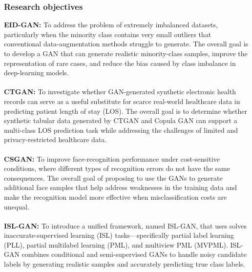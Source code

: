 \documentclass[12pt,a4paper]{article}
\begin{document}
\subsubsection{Research objectives}
\textbf{EID-GAN:} To address the problem of extremely imbalanced datasets, particularly when the minority class contains very small outliers that conventional data-augmentation methods struggle to generate. The overall goal is to develop a GAN that can generate realistic minority-class samples, improve the representation of rare cases, and reduce the bias caused by class imbalance in deep-learning models. \\
\\ \textbf{CTGAN:} To investigate whether GAN-generated synthetic electronic health records can serve as a useful substitute for scarce real-world healthcare data in predicting patient length of stay (LOS). The overall goal is to determine whether synthetic tabular data generated by CTGAN and Copula GAN can support a multi-class LOS prediction task while addressing the challenges of limited and privacy-restricted healthcare data. \\
\\ \textbf{CSGAN:} To improve face-recognition performance under cost-sensitive conditions, where different types of recognition errors do not have the same consequences. The overall goal of proposing to use the GANs to generate additional face samples that help address weaknesses in the training data and make the recognition model more effective when misclassification costs are unequal. \\
\\ \textbf{ISL-GAN:} To introduce a unified framework, named ISL-GAN, that uses solves inaccurate-supervised learning (ISL) tasks—specifically partial label learning (PLL), partial multilabel learning (PML), and multiview PML (MVPML). ISL-GAN combines conditional and semi-supervised GANs to handle noisy candidate labels by generating realistic samples and accurately predicting true class labels.
\end{document}
